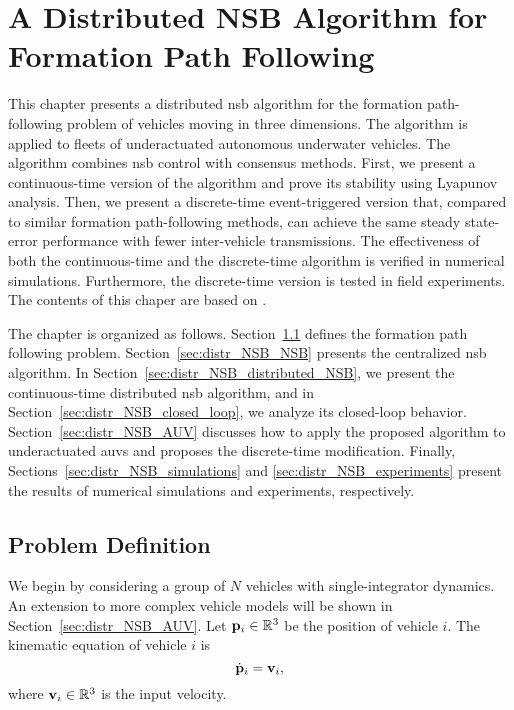 \chapter{A Distributed NSB Algorithm for Formation Path Following}
\label{chap:distr_NSB}

This chapter presents a distributed \acrlong{nsb} algorithm for the formation path-following problem of vehicles moving in three dimensions.
The algorithm is applied to fleets of underactuated autonomous underwater vehicles.
The algorithm combines \acrlong{nsb} control with consensus methods.
First, we present a continuous-time version of the algorithm and prove its stability using Lyapunov analysis.
Then, we present a discrete-time event-triggered version that, compared to similar formation path-following methods, can achieve the same steady state-error performance with fewer inter-vehicle transmissions.
The effectiveness of both the continuous-time and the discrete-time algorithm is verified in numerical simulations.
Furthermore, the discrete-time version is tested in field experiments.  
The contents of this chaper are based on \cite{matous_singularity_2023}.

The chapter is organized as follows.
Section~\ref{sec:distr_NSB_problem} defines the formation path following problem.
Section~\ref{sec:distr_NSB_NSB} presents the centralized \gls{nsb} algorithm.
In Section~\ref{sec:distr_NSB_distributed_NSB}, we present the continuous-time distributed \gls{nsb} algorithm, and in Section~\ref{sec:distr_NSB_closed_loop}, we analyze its closed-loop behavior.
Section~\ref{sec:distr_NSB_AUV} discusses how to apply the proposed algorithm to underactuated \glspl{auv} and proposes the discrete-time modification.
Finally, Sections~\ref{sec:distr_NSB_simulations} and \ref{sec:distr_NSB_experiments} present the results of numerical simulations and experiments, respectively.

\section{Problem Definition}
\label{sec:distr_NSB_problem}
We begin by considering a group of $N$ vehicles with single-integrator dynamics.
An extension to more complex vehicle models will be shown in Section~\ref{sec:distr_NSB_AUV}.
Let $\mathbf{p}_i \in \mathbb{R}^3$ be the position of vehicle $i$.
The kinematic equation of vehicle $i$ is
\begin{equation}
    \dot{\mathbf{p}}_i = \mathbf{v}_i,
    \label{eq:distr_NSB_kinematics}
\end{equation}
where $\mathbf{v}_i \in \mathbb{R}^3$ is the input velocity.

